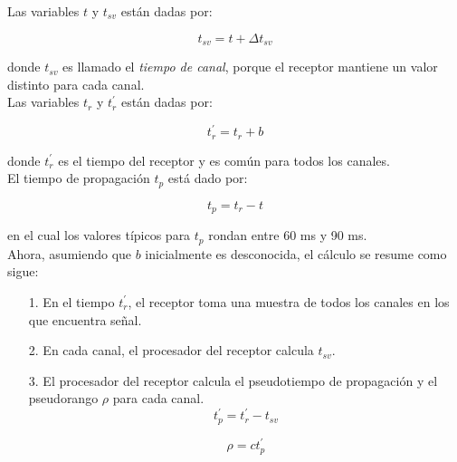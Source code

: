 {\setlength{\parindent}{0pt}
Las variables $t$ y $t_{sv}$ están dadas por: 

\begin{equation}
\label{Eq:tsv}
t_{sv} = t + \Delta t_{sv}
\end{equation}

donde $t_{sv}$ es llamado el \textit{tiempo de canal}, porque el receptor mantiene un valor distinto para cada canal.\\

Las variables $t_r$ y $t^{'}_r$ están dadas por:

\begin{equation}
\label{Eq:t_r}
t^{'}_r = t_r + b
\end{equation}

donde $t^{'}_r$ es el tiempo del receptor y es común para todos los canales. \\

El tiempo de propagación $t_p$ está dado por:

\begin{equation}
\label{Eq:t_p}
t_p = t_r - t
\end{equation}

en el cual los valores típicos para $t_p$ rondan entre 60 ms y 90 ms. \\

Ahora, asumiendo que $b$ inicialmente es desconocida, el cálculo se resume como sigue:\\

\begin{itemize}
\item[1.] En el tiempo $t^{'}_r$, el receptor toma una muestra de todos los canales en los que encuentra señal.\\

\item[2.] En cada canal, el procesador del receptor calcula $t_{sv}$.\\

\item[3.] El procesador del receptor calcula el pseudotiempo de propagación y el pseudorango $\rho$ para cada canal.\\

\begin{equation}
\label{Eq:t'_p}
t^{'}_p = t^{'}_r - t_{sv}
\end{equation}

\begin{equation}
\label{Eq:rho}
\rho = ct^{'}_p
\end{equation}


\end{itemize}}
